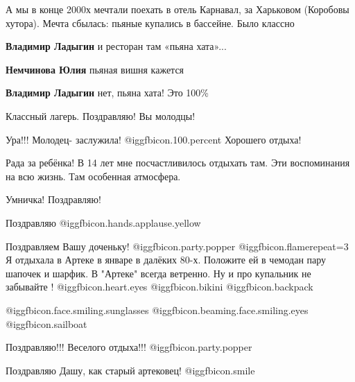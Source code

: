 \begin{itemize}
А мы в конце 2000х мечтали поехать в отель Карнавал, за Харьковом (Коробовы
хутора). Мечта сбылась: пьяные купались в бассейне. Было классно

\begin{itemize} %
\textbf{Владимир Ладыгин} и ресторан там «пьяна хата»...

\textbf{Немчинова Юлия} пьяная вишня кажется

\textbf{Владимир Ладыгин} нет, пьяна хата! Это 100\%
\end{itemize} %

Классный лагерь. Поздравляю! Вы молодцы!

Ура!!! Молодец- заслужила!  @igg{fbicon.100.percent} 
Хорошего отдыха!

Рада за ребёнка! В 14 лет мне посчастливилось отдыхать там. Эти воспоминания на всю жизнь. Там особенная атмосфера.

Умничка! Поздравляю!

Поздравляю @igg{fbicon.hands.applause.yellow} 


Поздравляем Вашу доченьку!  @igg{fbicon.party.popper}  @igg{fbicon.flame}{repeat=3}  Я отдыхала в Артеке в январе в далёких
80-х. Положите ей в чемодан пару шапочек и шарфик. В "Артеке" всегда ветренно.
Ну и про купальник не забывайте ! @igg{fbicon.heart.eyes}  @igg{fbicon.bikini}  @igg{fbicon.backpack} 

\begin{itemize} %
 @igg{fbicon.face.smiling.sunglasses}  @igg{fbicon.beaming.face.smiling.eyes}  @igg{fbicon.sailboat} 
\end{itemize} %

Поздравляю!!! Веселого отдыха!!!  @igg{fbicon.party.popper} 

Поздравляю Дашу, как старый артековец!  @igg{fbicon.smile} 

\end{itemize} %
